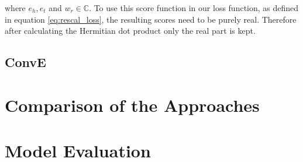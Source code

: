 where $e_h, e_t$ and $w_r\in \mathbb{C}$. To use this score function in our loss function, as defined in equation \ref{eq:rescal_loss}, the resulting scores need to be purely real. Therefore after calculating the Hermitian dot product only the real part is kept.  

\subsection{ConvE}
\label{cha:conve}

\section{Comparison of the Approaches}
\label{cha:compare_approaches}

\section{Model Evaluation}
\label{cha:evaluation}